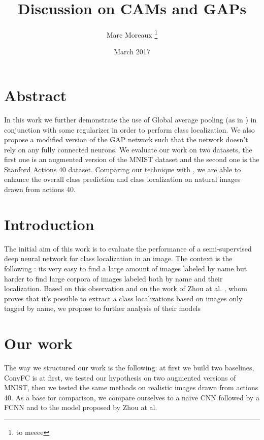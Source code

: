 \documentclass[12pt, letterpaper, twoside]{article}
\title{Discussion on CAMs and GAPs}
\author{Marc Moreaux \thanks{to meeee}}
\date{March 2017}
\begin{document}
	\begin{titlepage}
	\maketitle
	\end{titlepage}

	\section{Abstract}
	\label{sec:abstract}
	In this work we further demonstrate the use of Global average pooling (as in \cite{zhou2016learning}) in conjunction with some regularizer in order to perform class localization. We also propose a modified version of the GAP network such that the network doesn't rely on any fully connected neurons. We evaluate our work on two datasets, the first one is an augmented version of the MNIST dataset\cite{lecun1998gradient} and the second one is the Stanford Actions 40 dataset\cite{yao2011human}. Comparing our technique with \cite{zhou2016learning}, we are able to enhance the overall class prediction and class localization on natural images drawn from actions 40. 


	\section{Introduction}
	\label{sec:introduction}
	The initial aim of this work is to evaluate the performance of a semi-supervised deep neural network for class localization in an image.
	The context is the following : its very easy to find a large amount of images labeled by name but harder to find large corpora of images labeled both by name and their localization. Based on this observation and on the work of Zhou at al. \cite{zhou2016learning}, whom proves that it's possible to extract a class localizations based on images only tagged by name, we propose to  further analysis of their models 

	\section{Our work}
	\label{sec:related_work}
	The way we structured our work is the following: at first we build two baselines, ConvFC is
	at first, we tested our hypothesis on two augmented versions of MNIST, then we tested the same methods on realistic images drawn from actions 40. As a base for comparison, we compare ourselves to a naive CNN followed by a FCNN and to the model proposed by Zhou at al. 
\end{document}
